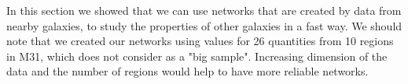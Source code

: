     In this section we showed that we can use networks that are created by data from nearby galaxies, to study the properties of other galaxies in a fast way.
    We should note that we created our networks using values for 26 quantities from 10 regions in M31, which does not consider as a "big sample".
    Increasing dimension of the data and the number of regions would help to have more reliable networks.
    
    